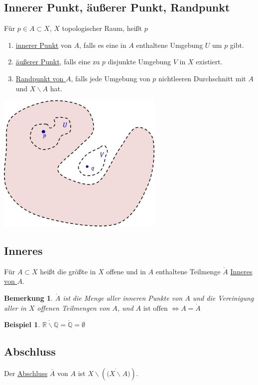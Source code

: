 \documentclass[a4paper,11pt,notitlepage]{report}
\newtheorem{remark}{Bemerkung}[chapter]
\newtheorem{example}{Beispiel}[chapter]
\newcommand{\R}{{\ensuremath{\mathbb{R}}}}
\newcommand{\Q}{{\ensuremath{\mathbb{Q}}}}
\newenvironment{Kasten}[1]
{
\hspace{0.05\linewidth}
\begin{center}
\begin{minipage}{0.9\linewidth}
\setlength{\fboxsep}{10pt}
\definecolor{shadecolor}{gray}{1}
\definecolor{framecolor}{gray}{0}
\def\FrameCommand{\fcolorbox{framecolor}{shadecolor}}
\MakeFramed {\FrameRestore}
\subsection{#1}
\begin{itshape}
}
{
\end{itshape}
\endMakeFramed
\end{minipage}
\end{center}
}
\begin{document}
\begin{Kasten}{Innerer Punkt, äußerer Punkt, Randpunkt}
	Für $p \in A \subset X$, $X$ topologischer Raum, heißt $p$
	\newline
	\begin{enumerate}[(1)]
		\item \underline{innerer Punkt} von $A$, falls es eine in $A$ enthaltene Umgebung $U$ um $p$ gibt. 
		\item \underline{äußerer Punkt}, falls eine zu $p$ disjunkte Umgebung $V$ in $X$ existiert.
		\item \underline{Randpunkt von $A$}, falls jede Umgebung von $p$ nichtleeren Durchschnitt mit $A$ und $X \backslash A$ hat.
	\end{enumerate}
\end{Kasten}
	\includegraphics[width=0.6\textwidth]{images/innen_aussen.jpg}

\begin{Kasten}{Inneres}
	Für $A \subset X$ heißt die größte in $X$ offene und in $A$ enthaltene Teilmenge $\mathring A$ \underline{Inneres von $A$}.
\end{Kasten}

\begin{remark}
	$\mathring A$ ist die Menge aller inneren Punkte von $A$ und die Vereinigung aller in $X$ offenen Teilmengen von $A$, und $A \text{ ist offen } \Leftrightarrow A = \mathring A$
\end{remark}

\begin{example}
	$\mathring {\R \backslash \Q} = \mathring \Q = \emptyset$
\end{example}

\begin{Kasten}{Abschluss}
	Der \underline{Abschluss} $\bar{A}$ von $A$ ist $X \backslash \left ( \mathring {(X \backslash A} ) \right )$.
\end{Kasten}
\end{document}
